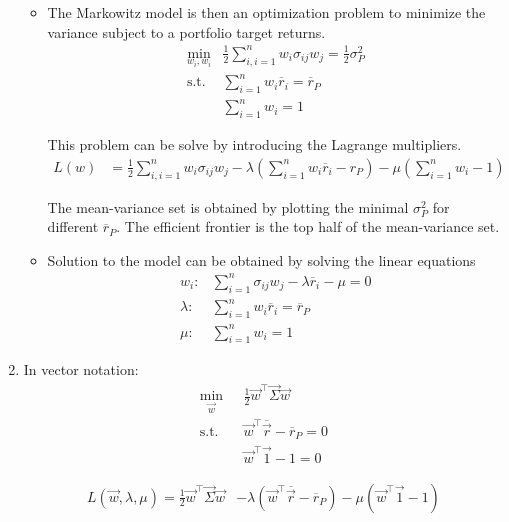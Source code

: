\documentclass[12pt,twoside]{article}
\begin{document}
\begin{enumerate}
\begin{itemize}
	\item The Markowitz model is then an optimization problem to minimize the variance subject to a portfolio target returns. 
	\begin{align*}
		\min_{w_i, w_i}	& \frac{1}{2}\sum_{i,i=1}^n w_i\sigma_{ij}w_j = \frac{1}{2}\sigma^2_P\\
		\text{s.t.  	}		& \sum_{i=1}^n w_i\overline{r}_i = \overline{r}_P\\
								&	\sum_{i=1}^n w_i = 1
	\end{align*}
	
	This problem can be solve by introducing the Lagrange multipliers.
	\begin{align*}
		L(w) & = \frac{1}{2}\sum_{i,i=1}^n w_i\sigma_{ij}w_j  - \lambda \left(\sum_{i=1}^n w_i\overline{r}_i - r_P\right) - \mu \left(\sum_{i=1}^n w_i - 1\right)
	\end{align*}
	
	The mean-variance set is obtained by plotting the minimal $\sigma_P^2$ for different $\overline{r}_P$. The efficient frontier is the top half of the mean-variance set.
	
	\item Solution to the model can be obtained by solving the linear equations
	\begin{align*}
			w_i:			&\sum_{i=1}^n \sigma_{ij}w_j - \lambda \overline{r}_i - \mu = 0\\
			\lambda:	&\sum_{i=1}^n w_i\overline{r}_i = \overline{r}_P\\
			\mu:			&\sum_{i=1}^n w_i = 1
	\end{align*}		
\end{itemize}

		
	\item In vector notation:
	\begin{align*}
			\min_{\vec{w}}	\text{  }	& \frac{1}{2}\vec{w}^\top\vec{\Sigma} \vec{w}\\
			\text{s.t.  	}						& \vec{w}^\top\overline{\vec{r}} - \overline{r}_P = 0\\
													&	\vec{w}^\top \vec{1} - 1 = 0
	\end{align*}
	
	\begin{align*}
		L(\vec{w}, \lambda, \mu) = \frac{1}{2}\vec{w}^\top\vec{\Sigma} \vec{w} &- \lambda \left(\vec{w}^\top\overline{\vec{r}} - \overline{r}_P \right) - \mu (\vec{w}^\top \vec{1} -1)
	\end{align*}
	

\end{enumerate}
\end{document}
